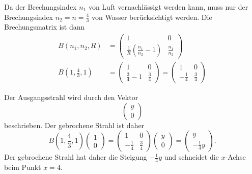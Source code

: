 \begin{loesung}
\begin{teilaufgaben}
\item
Da der Brechungsindex $n_1$ von Luft vernachlässigt werden kann, muss nur der
Brechungsindex $n_2=n=\frac43$ von Wasser berücksichtigt werden.
Die Brechungsmatrix  ist dann
\begin{align*}
B(n_1,n_2,R)
&=
\begin{pmatrix}
1&0\\
\frac{1}{R}\left(\frac{n_1}{n_2}-1\right) & \frac{n_1}{n_2}
\end{pmatrix}
\\
B(1,{\textstyle\frac43},1)
&=
\begin{pmatrix}
1&0\\
\frac{3}{4}-1 & \frac{3}{4}
\end{pmatrix}
=
\begin{pmatrix}
1&0\\
-\frac{1}{4} & \frac{3}{4}
\end{pmatrix}
\end{align*}
\item
Der Ausgangsstrahl wird durch den Vektor
\[
\begin{pmatrix}y\\0\end{pmatrix}
\]
beschrieben.
Der gebrochene Strahl ist daher
\[
B(1,{\textstyle\frac43},1)
\begin{pmatrix}
1\\0
\end{pmatrix}
=
\begin{pmatrix}
1&0\\
-\frac{1}{4} & \frac{3}{4}
\end{pmatrix}
\begin{pmatrix}
y\\0
\end{pmatrix}
=
\begin{pmatrix}
y\\
-\frac14y
\end{pmatrix}.
\]
Der gebrochene Strahl hat daher die Steigung $-\frac14y$ und schneidet die
$x$-Achse beim Punkt $x=4$.
\qedhere
\end{teilaufgaben}
\end{loesung}
